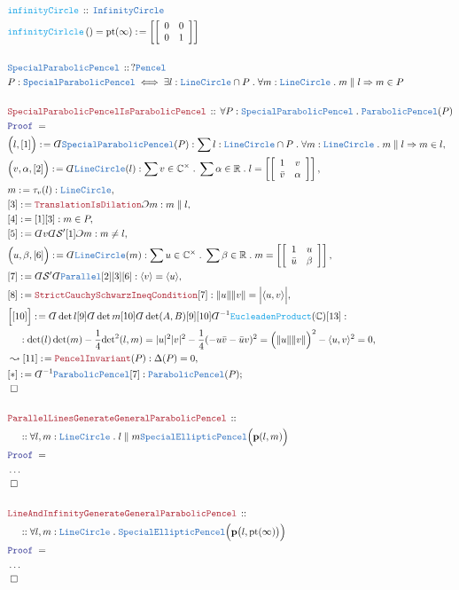 \documentclass[12pt]{scrartcl}
\newcommand{\TYPE}[1]{\textcolor{NavyBlue}{\mathtt{#1}}}
\newcommand{\FUNC}[1]{\textcolor{Cerulean}{\mathtt{#1}}}
\newcommand{\LOGIC}[1]{\textcolor{Blue}{\mathtt{#1}}}
\newcommand{\THM}[1]{\textcolor{Maroon}{\mathtt{#1}}}
\renewcommand{\.}{\; . \;}
\newcommand{\de}{: \kern 0.1pc =}
\newcommand{\Act}[1]{\left( #1 \right)}
\newcommand{\Theorem}[2]{& \THM{#1} \, :: \, #2 \\ & \Proof = \\ }
\newcommand{\DeclareType}[2]{& \TYPE{#1} \, :: \, #2 \\}
\newcommand{\DefineType}[3]{& #1 : \TYPE{#2} \iff #3 \\}
\newcommand{\DeclareFunc}[2]{& \FUNC{#1} \, :: \, #2 \\}
\newcommand{\DefineNamedFunc}[4]{&  \FUNC{#1}\Act{#2} = #3 \de #4 \\}
\newcommand{\NewLine}{\\ & \kern 1pc}
\newcommand{\Page}[1]{ \begin{align*} #1 \end{align*}   }
\newcommand{ \bd }{ \ByDef }
\newcommand{\NoProof}{ & \ldots \\ \EndProof}
\newcommand{\Imply}{\Rightarrow}
\newcommand{\Reals}{\mathbb{R} }
\newcommand{\Complex}{\mathbb{C}}
\newcommand{\Say}[3]{& #1 \de #2 : #3, \\}
\newcommand{\Conclude}[3]{& #1 \de #2 : #3; \\}
\newcommand{\Derive}[3]{& \leadsto #1 \de #2 : #3, \\}
\newcommand{\QED}{\; \square}
\newcommand{\EndProof}{& \QED \\}
\newcommand{\ByDef}{\rotatebox[origin=c]{-180}{$D$}}%
\newcommand{\ByConstr}{\rotatebox[origin=c]{-180}{$C$}}%
\newcommand{\Proof}{\LOGIC{Proof} \; }
\renewcommand{\S}{\mathcal{S}}
\newcommand{\p}{\mathbf{p}}
\begin{document}
\Page{
	\DeclareFunc{infinityCircle}{\TYPE{InfinityCircle}}
	\DefineNamedFunc{infinityCirlcle}{}{\mathrm{pt}(\infty)}
	{
		\left[\left[
			\begin{array}{cc}
			0 & 0 \\
			0 & 1
			\end{array}
		\right]\right]
	}
	\\
	\DeclareType{SpecialParabolicPencel}{?\TYPE{Pencel}}
	\DefineType{P}{SpecialParabolicPencel}
	{
		\exists l : \TYPE{LineCircle} \cap P \.
		\forall m : \TYPE{LineCircle} \.
		m \parallel l \Imply m \in P
	}
	\\
	\Theorem{SpecialParabolicPencelIsParabolicPencel}
	{
		\forall P : \TYPE{SpecialParabolicPencel} \.
		\TYPE{ParabolicPencel}(P) 
	}
	\Say{\Big(l,[1]\Big)}
	{ \bd \TYPE{SpecialParabolicPencel}(P) }
	{ 
		\sum l : \TYPE{LineCircle} \cap P \.  
		\forall m : \TYPE{LineCircle} \. 
			m \parallel l  \Imply
			m \in l
	}
	\Say{\Big( v, \alpha, [2]\Big)}{\bd \TYPE{LineCircle}(l)}
	{
		\sum v \in \Complex^\times \.
		\sum \alpha \in \Reals \.
		l =
		\left[ \left[ 
			\begin{array}{cc}
				1 & v \\
				\bar v & \alpha
			\end{array}
		\right] \right]
	}
	\Say{m}{\tau_v(l)}{\TYPE{LineCircle}}
	\Say{[3]}{\THM{TranslationIsDilation}\ByConstr m}{m \parallel l}
	\Say{[4]}{[1][3]}{m \in P}
	\Say{[5]}{\bd v \bd \S'[1]\ByConstr m}{m \neq l}
	\Say{\Big( u, \beta, [6]\Big)}{\bd \TYPE{LineCircle}(m)}
	{
		\sum u \in \Complex^\times \.
		\sum \beta \in \Reals \.
		m =
		\left[ \left[ 
			\begin{array}{cc}
				1 & u \\
				\bar u & \beta
			\end{array}
		\right] \right]
	}
	\Say{[7]}{\bd \S'\bd \TYPE{Parallel} [2][3][6]}{\langle v \rangle = \langle u \rangle}
	\Say{[8]}{\THM{StrictCauchySchwarzIneqCondition}[7]}
	{
		\| u  \| \| v \| = \Big| \langle u, v \rangle \Big| 
	}
	\Say{\Big[[10]\Big]}{ 
		\bd \det l [9] \bd \det m [10] \bd \det(A,B)[9][10]
		\bd^{-1} \FUNC{EucleadenProduct}(\Complex)
		[13]
	}
	{
		\NewLine :
		\det(l) \det(m) - \frac{1}{4}{\det}^2(l,m) =  
		|u|^2|v|^2  -  \frac{1}{4}( -u \bar v - \bar u v  )^2 = 
		\Big(\| u \| \| v \| \Big)^2  - \langle u, v \rangle^2 = 0
	}
	\Derive{[11]}{\THM{PencelInvariant}(P)}{\Delta(P) = 0}
	\Conclude{[*]}{\bd^{-1} \TYPE{ParabolicPencel}[7]} 
	{
		\TYPE{ParabolicPencel}(P)
	}
	\EndProof
	\\
	\Theorem{ParallelLinesGenerateGeneralParabolicPencel}
	{
		\NewLine ::
		\forall l,m : \TYPE{LineCircle} \.
		l \parallel m
		\TYPE{SpecialEllipticPencel}\Big( \p(l,m)  \Big)
	}
	\NoProof
	\\
	\Theorem{LineAndInfinityGenerateGeneralParabolicPencel}
	{
		\NewLine ::
		\forall l,m : \TYPE{LineCircle} \. 
		\TYPE{SpecialEllipticPencel}\Big( \p\big(l,\mathrm{pt}(\infty)\big)  \Big)
	}
	\NoProof
}
\end{document}
